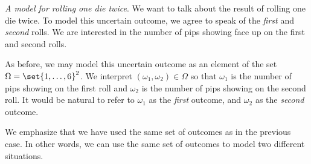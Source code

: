 \textit{A model for rolling one die twice}.
We want to talk about the result of rolling one die twice.
To model this uncertain outcome, we agree to speak of the \textit{first} and \textit{second} rolls.
We are interested in the number of pips showing face up on the first and second rolls.

As before, we may model this uncertain outcome as an element of the set $\Omega  = \set{1, \dots , 6}^2$.
We interpret $(\omega _1, \omega _2) \in \Omega $ so that $\omega _1$ is the number of pips showing on the first roll and $\omega _2$ is the number of pips showing on the second roll.
It would be natural to refer to $\omega _1$ as the \textit{first} outcome, and $\omega _2$ as the \textit{second} outcome.

We emphasize that we have used the same set of outcomes as in the previous case.
In other words, we can use the same set of outcomes to model two different situations.
%  

